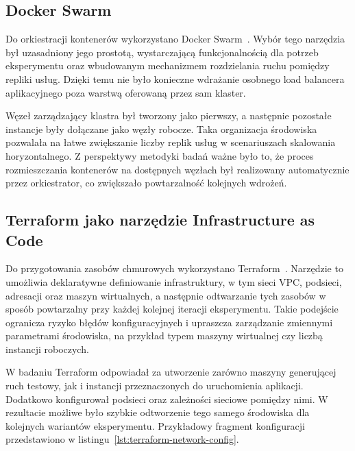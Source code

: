\subsection{Docker Swarm}

Do orkiestracji kontenerów wykorzystano Docker Swarm~\cite{dockerswarmdocs}. Wybór tego narzędzia był uzasadniony jego prostotą, wystarczającą funkcjonalnością dla potrzeb eksperymentu oraz wbudowanym mechanizmem rozdzielania ruchu pomiędzy repliki usług. Dzięki temu nie było konieczne wdrażanie osobnego load balancera aplikacyjnego poza warstwą oferowaną przez sam klaster.

Węzeł zarządzający klastra był tworzony jako pierwszy, a następnie pozostałe instancje były dołączane jako węzły robocze. Taka organizacja środowiska pozwalała na łatwe zwiększanie liczby replik usług w scenariuszach skalowania horyzontalnego. Z perspektywy metodyki badań ważne było to, że proces rozmieszczania kontenerów na dostępnych węzłach był realizowany automatycznie przez orkiestrator, co zwiększało powtarzalność kolejnych wdrożeń.

\subsection{Terraform jako narzędzie Infrastructure as Code}

Do przygotowania zasobów chmurowych wykorzystano Terraform~\cite{terraformdocs}. Narzędzie to umożliwia deklaratywne definiowanie infrastruktury, w tym sieci VPC, podsieci, adresacji oraz maszyn wirtualnych, a następnie odtwarzanie tych zasobów w sposób powtarzalny przy każdej kolejnej iteracji eksperymentu. Takie podejście ogranicza ryzyko błędów konfiguracyjnych i upraszcza zarządzanie zmiennymi parametrami środowiska, na przykład typem maszyny wirtualnej czy liczbą instancji roboczych.

W badaniu Terraform odpowiadał za utworzenie zarówno maszyny generującej ruch testowy, jak i instancji przeznaczonych do uruchomienia aplikacji. Dodatkowo konfigurował podsieci oraz zależności sieciowe pomiędzy nimi. W rezultacie możliwe było szybkie odtworzenie tego samego środowiska dla kolejnych wariantów eksperymentu. Przykładowy fragment konfiguracji przedstawiono w listingu~\ref{lst:terraform-network-config}.

